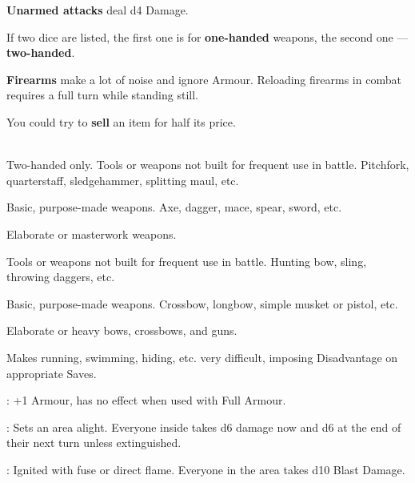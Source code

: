\documentclass[itdr]{subfiles}
\begin{document}
\textbf{Unarmed attacks} deal d4 Damage.

If two dice are listed, the first one is for \textbf{one-handed} weapons, the second one --- \textbf{two-handed}.

\textbf{Firearms} make a lot of noise and ignore Armour. Reloading firearms in combat requires a full turn while standing still.

You could try to \textbf{sell} an item for half its price.



\\Two-handed only. Tools or weapons not built for frequent use in battle. Pitchfork, quarterstaff, sledgehammer, splitting maul, etc.

 Basic, purpose-made weapons. Axe, dagger, mace, spear, sword, etc.

 Elaborate or masterwork weapons.



 Tools or weapons not built for frequent use in battle. Hunting bow, sling, throwing daggers, etc.

 Basic, purpose-made weapons. Crossbow, longbow, simple musket or pistol, etc.

 Elaborate or heavy bows, crossbows, and guns.




 Makes running, swimming, hiding, etc. very difficult, imposing Disadvantage on appropriate Saves.

: +1 Armour, has no effect when used with Full Armour.



: Sets an area alight. Everyone inside takes d6 damage now and d6 at the end of their next turn unless extinguished.

: Ignited with fuse or direct flame. Everyone in the area takes d10 Blast Damage.
\end{document}
